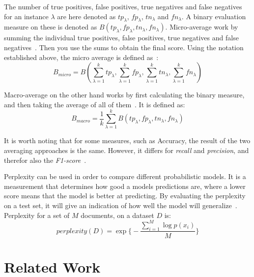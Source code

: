 The number of true positives, false positives, true negatives and false negatives for an instance $\lambda$ are here denoted as $tp_\lambda$, $fp_\lambda$, $tn_\lambda$ and $fn_\lambda$.
A binary evaluation measure on these is denoted as $B(tp_\lambda, fp_\lambda, tn_\lambda, fn_\lambda)$.
Micro-average work by summing the individual true positives, false positives, true negatives and false negatives~\cite{tsoumakas2009mining}.
Then you use the sums to obtain the final score.
Using the notation established above, the micro average is defined as~\cite{tsoumakas2009mining}:
\begin{equation}
    B_{micro} = B(\sum_{\lambda = 1}^ktp_\lambda, \sum_{\lambda = 1}^kfp_\lambda, \sum_{\lambda = 1}^ktn_\lambda, \sum_{\lambda = 1}^kfn_\lambda)
\end{equation}

Macro-average on the other hand works by first calculating the binary measure, and then taking the average of all of them~\cite{tsoumakas2009mining}.
It is defined as:
\begin{equation}
    B_{macro} = \frac{1}{k}\sum_{\lambda = 1}^kB(tp_\lambda, fp_\lambda, tn_\lambda, fn_\lambda)
\end{equation}

It is worth noting that for some measures, such as Accuracy, the result of the two averaging approaches is the same.
However, it differs for \textit{recall} and \textit{precision}, and therefor also the \textit{F1-score}~\cite{tsoumakas2009mining}.

Perplexity can be used in order to compare different probabilistic models. 
It is a measurement that determines how good a models predictions are, where a lower score means that the model is better at predicting.
By evaluating the perplexity on a test set, it will give an indication of how well the model will generalize~\cite{blei2003latent}.
Perplexity for a set of $M$ documents, on a dataset $D$ is:
\begin{equation}
    perplexity(D) = \exp \big \{ -\frac{\sum_{i=1}^M \log p(x_i) }{M} \big \}
\end{equation}

\section{Related Work}

